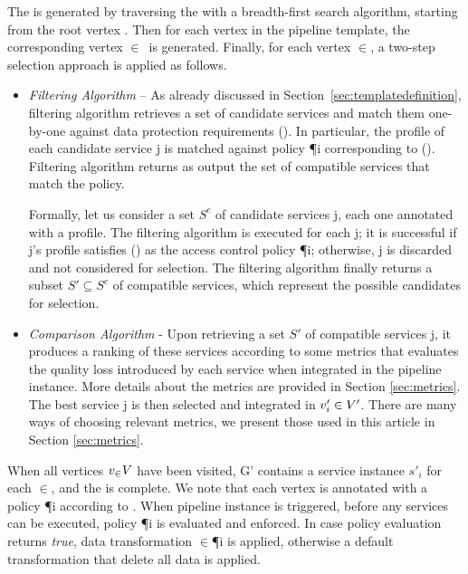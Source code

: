   The \pipelineInstance  is generated by traversing the \pipelineTemplate with a breadth-first search algorithm, starting from the root vertex .
  Then for each vertex  in the pipeline template, the corresponding vertex $\in$\Vp\ is generated.
  Finally, for each vertex $\in$\Vp, a two-step selection approach is applied as follows.
  \begin{itemize}

    \item \textit{Filtering Algorithm} -- As already discussed in Section~\ref{sec:templatedefinition}, filtering algorithm retrieves a set of candidate services and match them one-by-one against data protection requirements \myLambda(). In particular, the profile of each candidate service \si{j} is matched against policy \P{i} corresponding to \myLambda(). Filtering algorithm returns as output the set of compatible services that match the policy.

          Formally, let us consider a set $S^c$ of candidate services \si{j}, each one annotated with a profile. The filtering algorithm is executed for each \si{j}; it is successful if \si{j}'s profile satisfies \myLambda() as the access control policy \P{i}; otherwise, \si{j} is discarded and not considered for selection. The filtering algorithm finally returns a subset $S'\subseteq S^c$ of compatible services, which represent the possible candidates for selection.

    \item \textit{Comparison Algorithm} - Upon retrieving a set $S'$ of compatible services \si{j}, it produces a ranking of these services according to some metrics that evaluates the quality loss introduced by each service when integrated in the pipeline instance. More details about the metrics are provided in Section \ref{sec:metrics}.
          The best service \si{j} is then selected and integrated in $v'_{i}\in V'$. There are many ways of choosing relevant metrics, we present those used in this article in Section \ref{sec:metrics}.
  \end{itemize}

  When all vertices $v_{\in} V$ have been visited, G' contains a service instance $s'_i$ for each $\in$\Vp, and the \pipelineInstance is complete. We note that each vertex  is annotated with a policy \P{i} according to \myLambda. When pipeline instance is triggered, before any services can be executed, policy \P{i} is evaluated and enforced. In case policy evaluation returns \emph{true}, data transformation \TP$\in$\P{i} is applied, otherwise a default transformation that delete all data is applied.

